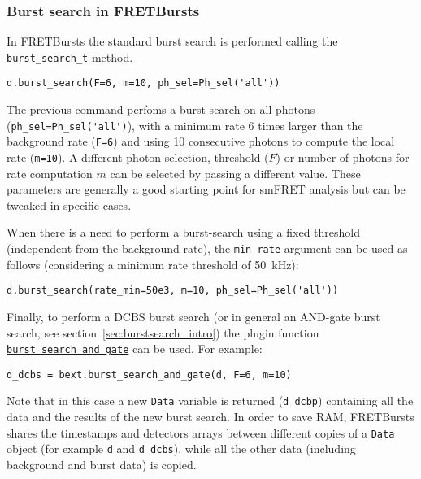 \subsubsection{Burst search in FRETBursts}
\label{sec:burstsearch_code}

In FRETBursts the standard burst search is performed calling the \href{http://fretbursts.readthedocs.org/en/latest/data_class.html#fretbursts.burstlib.Data.burst_search_t}{\verb|burst_search_t| method}.

\begin{verbatim}
d.burst_search(F=6, m=10, ph_sel=Ph_sel('all'))
\end{verbatim}

The previous command perfoms a burst search on all photons (\verb|ph_sel=Ph_sel('all')|), with a minimum rate 6 times larger than the background rate (\verb|F=6|) and using 10 consecutive photons to compute the local rate (\verb|m=10|).
A different photon selection, threshold ($F$) or number of photons for rate computation $m$ can be selected by passing a different value. These parameters are generally a good starting point for smFRET analysis but can be tweaked in specific cases.

When there is a need to perform a burst-search using a fixed threshold (independent from the background rate), 
the \verb|min_rate| argument can be used as follows (considering a minimum rate threshold of 50~kHz):

\begin{verbatim}
d.burst_search(rate_min=50e3, m=10, ph_sel=Ph_sel('all'))
\end{verbatim}

Finally, to perform a DCBS burst search (or in general an AND-gate burst search, 
see section~\ref{sec:burstsearch_intro}) the plugin function 
\href{http://fretbursts.readthedocs.org/en/latest/plugins.html#fretbursts.burstlib_ext.burst_search_and_gate}{\verb|burst_search_and_gate|} 
can be used. For example:

\begin{verbatim}
d_dcbs = bext.burst_search_and_gate(d, F=6, m=10)
\end{verbatim}

Note that in this case a new \verb|Data| variable is returned (\verb|d_dcbp|) containing all the data and the results of the new burst search. In order to save RAM, FRETBursts shares the timestamps and detectors arrays between different copies of a \verb|Data| object (for example \verb|d| and \verb|d_dcbs|), while all the other data (including background and burst data) is copied. 

